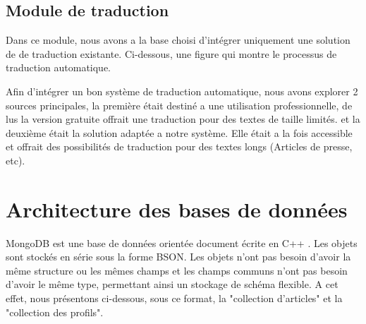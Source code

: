 \subsection{Module de traduction}

Dans ce module, nous avons a la base choisi d'intégrer uniquement une solution de de traduction existante. Ci-dessous, une figure qui montre le processus de traduction automatique.




Afin d'intégrer un bon système de traduction automatique, nous avons explorer 2 sources principales, la première était destiné a une utilisation professionnelle, de lus la version gratuite offrait une traduction pour des textes de taille limités. et la deuxième était la solution adaptée a notre système. Elle était a la fois accessible et offrait des possibilités de traduction pour des textes longs (Articles de presse, etc). 



\section{Architecture des bases de données}
MongoDB est une base de données orientée document écrite en C++ \cite{NOSQL3}. Les objets sont stockés en série sous la forme BSON.
Les objets n'ont pas besoin d'avoir la même structure ou les mêmes champs et les champs communs n'ont pas besoin d'avoir le même type,
permettant ainsi un stockage de schéma flexible. A cet effet, nous présentons ci-dessous, sous ce format, la "collection d'articles" et la "collection des profils".

